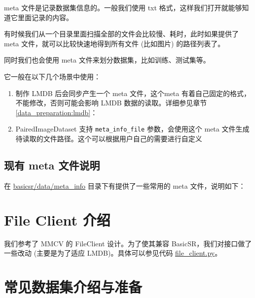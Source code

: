 \documentclass[../main.tex]{subfiles}
\begin{document}
meta 文件是记录数据集信息的。一般我们使用 txt 格式，这样我们打开就能够知道它里面记录的内容。

有时候我们从一个目录里面扫描全部的文件会比较慢、耗时，此时如果提供了 meta 文件，就可以比较快速地得到所有文件 (比如图片) 的路径列表了。

同时我们也会使用 meta 文件来划分数据集，比如训练、测试集等。

它一般在以下几个场景中使用：

\begin{enumerate}
    \item 制作 LMDB 后会同步产生一个 meta 文件，这个meta 有着自己固定的格式，不能修改，否则可能会影响 LMDB 数据的读取。详细参见章节\ref{data_preparation:lmdb}：
    \item PairedImageDataset 支持 \texttt{meta_info_file} 参数，会使用这个 meta 文件生成待读取的文件路径。这个可以根据用户自己的需要进行自定义
\end{enumerate}


\subsection{现有 meta 文件说明}\label{data_preparation:existing_meta_file}

在 \href{https://github.com/XPixelGroup/BasicSR/tree/master/basicsr/data/meta_info}{basicsr/data/meta_info} 目录下有提供了一些常用的 meta 文件，说明如下：


\section{File Client 介绍}\label{data_preparation:file_client}

我们参考了 MMCV 的 FileClient 设计。为了使其兼容 BasicSR，我们对接口做了一些改动 (主要是为了适应 LMDB)。具体可以参见代码 \href{https://github.com/XPixelGroup/BasicSR/blob/master/basicsr/utils/file_client.py}{file\_client.py}。


\section{常见数据集介绍与准备}\label{data_preparation:dataset}
\end{document}
